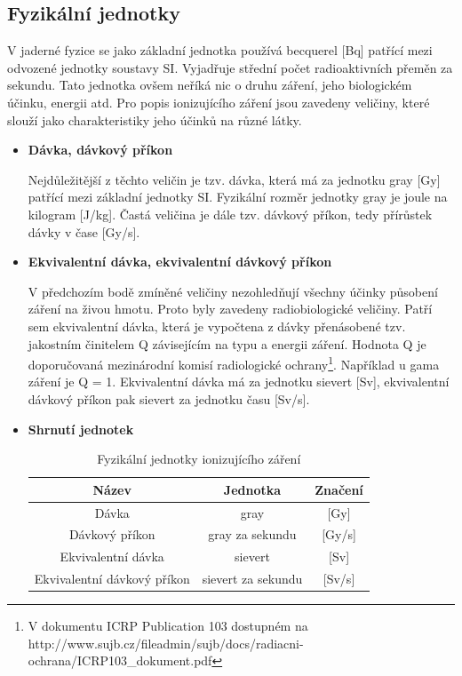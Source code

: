 \subsection{Fyzikální jednotky} 
V jaderné fyzice se jako základní jednotka používá becquerel [Bq] patřící mezi odvozené jednotky soustavy SI. Vyjadřuje střední počet radioaktivních přeměn za sekundu. Tato jednotka ovšem neříká nic o druhu záření, jeho biologickém účinku, energii atd. Pro popis ionizujícího záření jsou zavedeny veličiny, které slouží jako charakteristiky jeho účinků na různé látky. \cite{atomInfo}

\begin{itemize}
	\item \textbf{Dávka, dávkový příkon}
	
		 Nejdůležitější z těchto veličin je tzv. dávka, která má za jednotku gray [Gy] patřící mezi základní jednotky SI. Fyzikální rozměr jednotky gray je joule na kilogram [J/kg]. Častá veličina je dále tzv. dávkový příkon, tedy přírůstek dávky v čase [Gy/s]. 
		
	\item \textbf{Ekvivalentní dávka, ekvivalentní dávkový příkon}

	 	V předchozím bodě zmíněné veličiny nezohledňují všechny účinky působení záření na živou hmotu. Proto byly zavedeny radiobiologické veličiny. Patří sem ekvivalentní dávka, která je vypočtena z dávky přenásobené tzv. jakostním činitelem Q závisejícím na typu a energii záření. Hodnota Q je doporučovaná mezinárodní komisí radiologické ochrany\footnote{V dokumentu ICRP Publication 103 dostupném na http://www.sujb.cz/fileadmin/sujb/docs/radiacni-ochrana/ICRP103\_dokument.pdf}. Například u gama záření je Q = 1. Ekvivalentní dávka má za jednotku sievert [Sv], ekvivalentní dávkový příkon pak sievert za jednotku času [Sv/s].
	 	
	\item \textbf{Shrnutí jednotek}
	
		\begin{table}[h!]
			\centering
			\caption{Fyzikální jednotky ionizujícího záření}
			\label{tab:tabulkaJednotek}
			\begin{tabular}{|c|c|c|}
				\hline
				\textbf{Název}              & \textbf{Jednotka}  & \textbf{Značení} \\ \hline
				Dávka                       & gray               & {[}Gy{]}         \\ \hline
				Dávkový příkon              & gray za sekundu    & {[}Gy/s{]}       \\ \hline
				Ekvivalentní dávka          & sievert            & {[}Sv{]}         \\ \hline
				Ekvivalentní dávkový příkon & sievert za sekundu & {[}Sv/s{]}       \\ \hline
			\end{tabular}
		\end{table}
\end{itemize}

